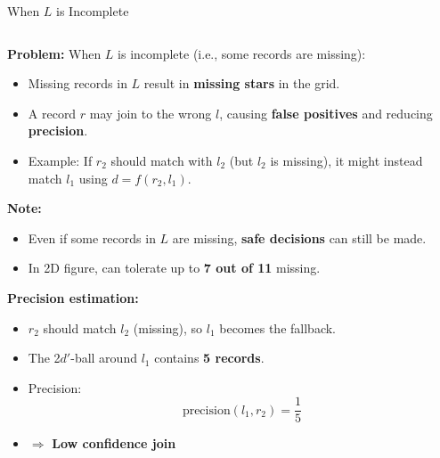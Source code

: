 \documentclass[8pt]{beamer} %
\begin{document}
	\begin{frame}{When \texorpdfstring{$L$}{L} is Incomplete}
		
		\small
		\begin{columns}
			
			
			\small
			\begin{column}{0.53\textwidth}
				\textbf{Problem:} When $L$ is incomplete (i.e., some records are missing):
				

				\begin{itemize}
					\item Missing records in $L$ result in \textbf{missing stars} in the grid.
					\item A record $r$ may join to the wrong $l$, causing \textbf{false positives} and reducing \textbf{precision}.
					\item Example: If $r_2$ should match with $l_2$ (but $l_2$ is missing), it might instead match $l_1$ using $d = f(r_2, l_1)$.
				\end{itemize}
				

				\textbf{Note:}
				\begin{itemize}
					\item Even if some records in $L$ are missing, \textbf{safe decisions} can still be made.
					\item In 2D figure, can tolerate up to \textbf{7 out of 11} missing.
				\end{itemize}
				

				\textbf{Precision estimation:}
				\begin{itemize}
					\item $r_2$ should match $l_2$ (missing), so $l_1$ becomes the fallback.
					\item The 2$d'$-ball around $l_1$ contains \textbf{5 records}.
					\item Precision:
					\[
					\text{precision}(l_1, r_2) = \frac{1}{5}
					\]
					\item $\Rightarrow$ \textbf{Low confidence join}
				\end{itemize}
				
			\end{column}
			

\end{columns}
\end{frame}
\end{document}
